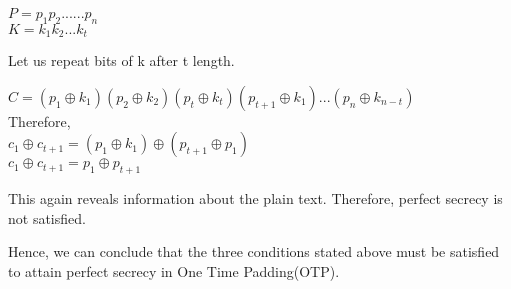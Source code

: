 \documentclass[11pt]{article}
\begin{document}
\begin{itemize}
    \begin{center}
        $P = p_1p_2......p_n$\\
        $K = k_1k_2...k_t$\\
    \end{center}
    Let us repeat bits of k after t length.
    \begin{center}
        $C = (p_1 \oplus k_1)(p_2 \oplus k_2)(p_t \oplus k_t)(p_{t+1} \oplus k_1)...(p_n \oplus k_{n-t})$\\
        Therefore,\\
        $c_1 \oplus c_{t+1} = (p_1 \oplus k_1) \oplus (p_{t+1} \oplus p_1)$\\
        $c_1 \oplus c_{t+1} = p_1 \oplus p_{t+1}$
    \end{center}
    This again reveals information about the plain text. Therefore, perfect secrecy is not satisfied.
\end{itemize}
Hence, we can conclude that the three conditions stated above must be satisfied to attain perfect secrecy in One Time Padding(OTP).
\end{document}
